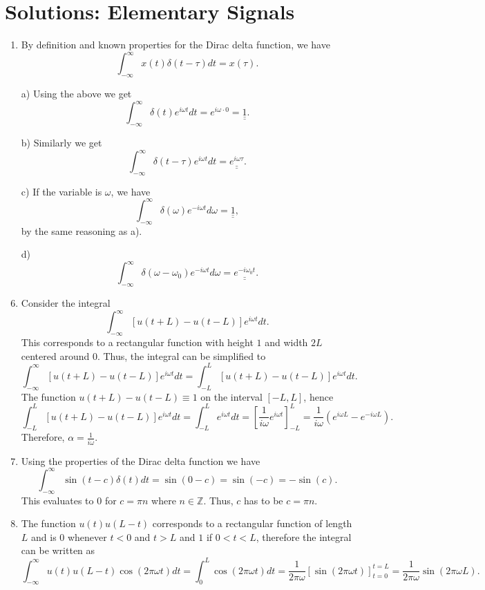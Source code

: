 \newpage
\section*{Solutions: Elementary Signals}

\begin{enumerate}
\item By definition and known properties for the Dirac delta function, we have
$$\int_{-\infty}^{\infty}x(t)\delta(t-\tau)dt=x(\tau).$$

\item[a)]
Using the above we get
$$\int_{-\infty}^{\infty}\delta(t)e^{i\omega t}dt=e^{i\omega\cdot 0}=\underline{\underline{1}}.$$

\item[b)]
Similarly we get
$$\int_{-\infty}^{\infty}\delta(t-\tau)e^{i\omega t}dt=\underline{\underline{e^{i\omega\tau}}}.$$

\item[c)]
If the variable is $\omega$, we have
$$\int_{-\infty}^{\infty}\delta(\omega)e^{-i\omega t}d\omega=\underline{\underline{1}},$$
by the same reasoning as a). 

\item[d)]
$$\int_{-\infty}^{\infty}\delta(\omega-\omega_{0})e^{-i\omega t}d\omega=\underline{\underline{e^{-i\omega_{0}t}}}.$$

\item Consider the integral
$$\int_{-\infty}^{\infty}[u(t+L)-u(t-L)]e^{i\omega t}dt.$$
This corresponds to a rectangular function with height $1$ and width $2L$ centered around $0$. Thus, the integral can be simplified to
$$\int_{-\infty}^{\infty}[u(t+L)-u(t-L)]e^{i\omega t}dt=\int_{-L}^{L}[u(t+L)-u(t-L)]e^{i\omega t}dt.$$
The function $u(t+L)-u(t-L)\equiv 1$ on the interval $[-L,L]$, hence
$$\int_{-L}^{L}[u(t+L)-u(t-L)]e^{i\omega t}dt=\int_{-L}^{L}e^{i\omega t}dt=\left[\frac{1}{i\omega}e^{i\omega t}\right]_{-L}^{L}=\frac{1}{i\omega}(e^{i\omega L}-e^{-i\omega L}).$$
Therefore, $\alpha=\frac{1}{i\omega}$.

\item Using the properties of the Dirac delta function we have
$$\int_{-\infty}^{\infty}\sin(t-c)\delta(t)dt=\sin(0-c)=\sin(-c)=-\sin(c).$$
This evaluates to $0$ for $c=\pi n$ where $n\in\mathbb{Z}$. Thus, $c$ has to be $c=\pi n$.

\item The function $u(t)u(L-t)$ corresponds to a rectangular function of length $L$ and is $0$ whenever $t<0$ and $t>L$ and $1$ if $0<t<L$, therefore the integral can be written as
$$\int_{-\infty}^{\infty}u(t)u(L-t)\cos(2\pi\omega t)dt=\int_{0}^{L}\cos(2\pi\omega t)dt=\frac{1}{2\pi\omega}\left[\sin(2\pi\omega t)\right]_{t=0}^{t=L}=\frac{1}{2\pi\omega}\sin(2\pi\omega L).$$


\end{enumerate}